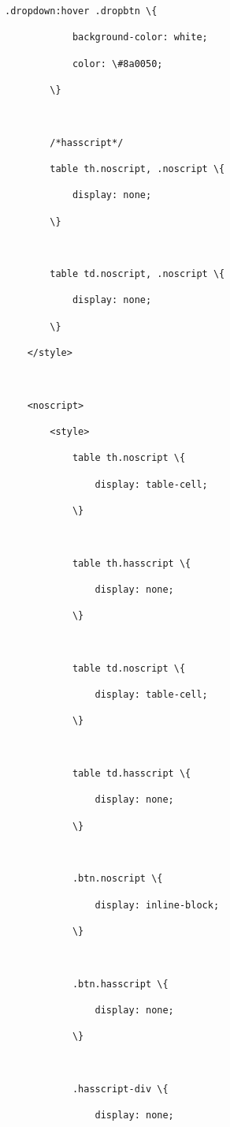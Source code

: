 \documentclass[11pt]{article}
\begin{document}
\begin{Verbatim}[commandchars=\\\{\}]
        .dropdown:hover .dropbtn \{

            background-color: white;

            color: \#8a0050;

        \}



        /*hasscript*/

        table th.noscript, .noscript \{

            display: none;

        \}



        table td.noscript, .noscript \{

            display: none;

        \}

    </style>



    <noscript>

        <style>

            table th.noscript \{

                display: table-cell;

            \}



            table th.hasscript \{

                display: none;

            \}



            table td.noscript \{

                display: table-cell;

            \}



            table td.hasscript \{

                display: none;

            \}



            .btn.noscript \{

                display: inline-block;

            \}



            .btn.hasscript \{

                display: none;

            \}



            .hasscript-div \{

                display: none;


\end{Verbatim}
\end{document}

